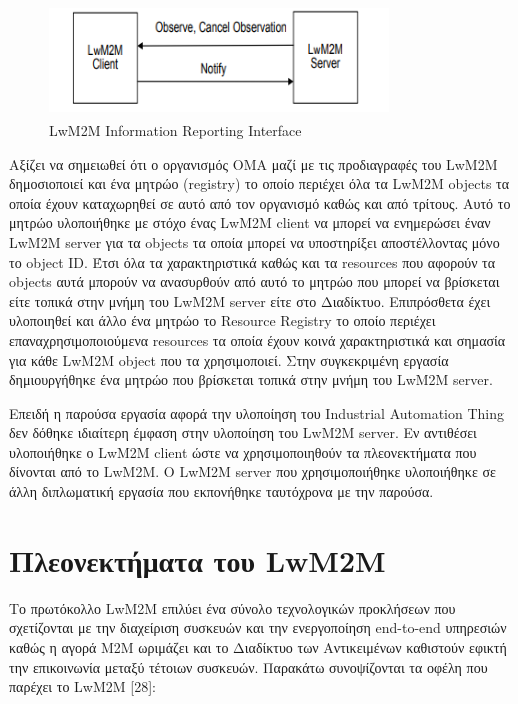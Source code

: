 \begin{figure}[htbp]
	\centering
		\includegraphics[height=3cm,width=9cm]{Figures/6.png}
	\caption{LwM2M Information Reporting Interface \cite{OMA2} }	
\end{figure}

Αξίζει να σημειωθεί ότι ο οργανισμός ΟΜΑ μαζί με τις προδιαγραφές του LwM2M δημοσιοποιεί και ένα μητρώο (registry) το οποίο περιέχει όλα τα LwM2M objects τα οποία έχουν καταχωρηθεί σε αυτό από τον οργανισμό καθώς και από τρίτους. Αυτό το μητρώο υλοποιήθηκε με στόχο ένας LwM2M client να μπορεί να ενημερώσει έναν LwM2M server για τα objects τα οποία μπορεί να υποστηρίξει αποστέλλοντας μόνο το object ID. Έτσι όλα τα χαρακτηριστικά καθώς και τα resources που αφορούν τα objects αυτά μπορούν να ανασυρθούν από αυτό το μητρώο που μπορεί να βρίσκεται είτε τοπικά στην μνήμη του LwM2M server είτε στο Διαδίκτυο. Επιπρόσθετα έχει υλοποιηθεί και άλλο ένα μητρώο το Resource Registry το οποίο περιέχει επαναχρησιμοποιούμενα resources τα οποία έχουν κοινά χαρακτηριστικά και σημασία για κάθε LwM2M object που τα χρησιμοποιεί. Στην συγκεκριμένη εργασία δημιουργήθηκε ένα μητρώο που βρίσκεται τοπικά στην μνήμη του LwM2M server.

	Επειδή η παρούσα εργασία αφορά την υλοποίηση του Industrial Automation Thing δεν δόθηκε ιδιαίτερη έμφαση στην υλοποίηση του LwM2M server. Εν αντιθέσει υλοποιήθηκε ο LwM2M client ώστε να χρησιμοποιηθούν τα πλεονεκτήματα που δίνονται από το LwM2M. Ο LwM2M server που χρησιμοποιήθηκε υλοποιήθηκε σε άλλη διπλωματική εργασία που εκπονήθηκε ταυτόχρονα με την παρούσα. 
	
\section{Πλεονεκτήματα του  LwM2M}

Το πρωτόκολλο LwM2M επιλύει ένα σύνολο τεχνολογικών προκλήσεων που σχετίζονται με την διαχείριση συσκευών και την ενεργοποίηση end-to-end υπηρεσιών καθώς η αγορά M2M ωριμάζει και το Διαδίκτυο των Αντικειμένων καθιστούν εφικτή την επικοινωνία μεταξύ τέτοιων συσκευών. Παρακάτω συνοψίζονται τα οφέλη που παρέχει το LwM2M [28]: 

